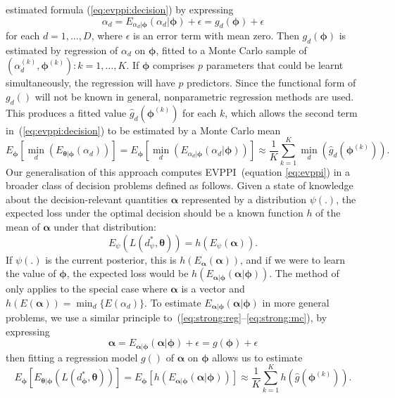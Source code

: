 \documentclass[12pt]{article}\usepackage[]{graphicx}\usepackage[]{color}
\begin{document}
\citet{strong:oakley:multievppi} estimated formula (\ref{eq:evppi:decision}) by expressing 
\begin{equation}
\label{eq:strong:reg}
  \alpha_d  =  E_{\alpha_d|\bm\phi}(\alpha_d|\bm\phi) + \epsilon  =  g_d(\bm\phi) + \epsilon
\end{equation}
for each $d=1,\ldots,D$, where $\epsilon$ is an error term with mean zero.  Then $g_d(\bm\phi)$ is estimated by regression of $\alpha_d$ on $\bm\phi$, fitted to a Monte Carlo sample of $(\alpha_d^{(k)}, \bm\phi^{(k)}): k=1,\ldots,K$. If $\bm\phi$ comprises $p$ parameters that could be learnt simultaneously, the regression will have $p$ predictors.  Since the functional form of $g_d()$ will not be known in general, nonparametric regression methods are used.  This produces a fitted value $\hat g_d(\bm\phi^{(k)})$ for each $k$, which allows the second term in~(\ref{eq:evppi:decision}) to be estimated by a Monte Carlo mean
\begin{equation}
\label{eq:strong:mc}
E_{\bm\phi} [  \min_d (E_{\bm\theta|\bm\phi}(\alpha_d)) ] = E_{\bm\phi} [  \min_d (E_{\alpha_d|\bm\phi}(\alpha_d|\bm\phi)) ] \approx \frac{1}{K}\sum_{k=1}^K \min_d(\hat g_d(\bm\phi^{(k)})).
\end{equation}
Our generalisation of this approach computes EVPPI~(equation \ref{eq:evppi}) in a broader class of decision problems defined as follows.  Given a state of knowledge about the decision-relevant quantities $\bm\alpha$ represented by a distribution $\psi(.)$, the expected loss under the optimal decision should be a known function $h$ of the mean of $\bm\alpha$ under that distribution:
\begin{equation}
  \label{eq:knownfun}
  E_{\psi} (L(d^*_\psi,\bm\theta)) = h(E_{\psi}(\bm\alpha)).
\end{equation}
If $\psi(.)$ is the current posterior, this is $h(E_{\bm\alpha}(\bm\alpha))$, and if we were to learn the value of $\bm\phi$, the expected loss would be $h(E_{\bm\alpha|\bm\phi}(\bm\alpha|\bm\phi))$.   The method of \citet{strong:oakley:multievppi} only applies to the special case where $\bm\alpha$ is a vector and $h(E(\bm\alpha)) = \min_d \{E(\alpha_d)\}$.   To estimate $E_{\bm\alpha|\bm\phi}(\bm\alpha|\bm\phi)$ in more general problems, we use a similar principle to~(\ref{eq:strong:reg}--\ref{eq:strong:mc}), by expressing
\begin{equation}
  \label{eq:evppi:reg}
  \bm\alpha  =  E_{\bm\alpha|\bm\phi}(\bm\alpha|\bm\phi) + \epsilon  =  g(\bm\phi) + \epsilon
\end{equation}
then fitting a regression model $g()$ of $\bm\alpha$ on $\bm\phi$ allows us to estimate
\[
E_{\bm\phi} [  E_{\bm\theta|\bm\phi} (L(d^*_{\bm\phi},\bm\theta)) ] = E_{\bm\phi} [  h (E_{\bm\alpha|\bm\phi}(\bm\alpha|\bm\phi)) ] \approx \frac{1}{K}\sum_{k=1}^K h(\hat g(\bm\phi^{(k)})).
\]
\end{document}
